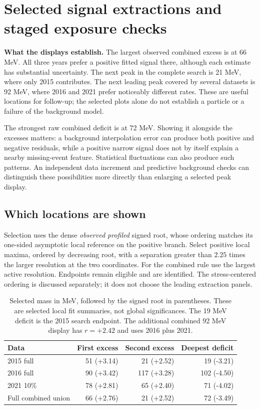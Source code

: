 \section{Selected signal extractions and staged exposure checks}
\label{sec:extractions}
\textbf{What the displays establish.} The largest observed combined excess is at 66 MeV. All three years prefer a positive fitted signal there, although each estimate has substantial uncertainty. The next peak in the complete search is 21 MeV, where only 2015 contributes. The next leading peak covered by several datasets is 92 MeV, where 2016 and 2021 prefer noticeably different rates. These are useful locations for follow-up; the selected plots alone do not establish a particle or a failure of the background model.

The strongest raw combined deficit is at 72 MeV. Showing it alongside the excesses matters: a background interpolation error can produce both positive and negative residuals, while a positive narrow signal does not by itself explain a nearby missing-event feature. Statistical fluctuations can also produce such patterns. An independent data increment and predictive background checks can distinguish these possibilities more directly than enlarging a selected peak display.

\subsection*{Which locations are shown}
Selection uses the dense \emph{observed profiled} signed root, whose ordering matches its one-sided asymptotic local reference on the positive branch. Select positive local maxima, ordered by decreasing root, with a separation greater than $2.25$ times the larger resolution at the two coordinates. For the combined rule use the largest active resolution. Endpoints remain eligible and are identified. The stress-centered ordering is discussed separately; it does not choose the leading extraction panels.

\begin{table}[H]\centering\small
\begin{tabular}{lrrr}\toprule
Data & First excess & Second excess & Deepest deficit\\\midrule
2015 full & 51 (+3.14) & 21 (+2.52) & 19 (-3.21)\\
2016 full & 90 (+3.42) & 117 (+3.28) & 102 (-4.50)\\
2021 10\% & 78 (+2.81) & 65 (+2.40) & 71 (-4.02)\\
Full combined union & 66 (+2.76) & 21 (+2.52) & 72 (-3.49)\\
\bottomrule\end{tabular}
\caption{Selected mass in MeV, followed by the signed root in parentheses. These are selected local fit summaries, not global significances. The 19 MeV deficit is the 2015 search endpoint. The additional combined 92 MeV display has $r=+2.42$ and uses 2016 plus 2021.}\end{table}

